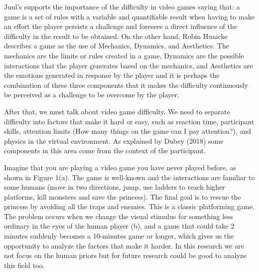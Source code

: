 Juul’s supports the importance of the difficulty in video games saying that: a game is a set of rules with a variable and quantifiable result when having to make an effort the player persists a challenge and foresees a direct influence of the difficulty in the result to be obtained. \cite{Aponte2009MeasuringDif}
On the other hand, Robin Hunicke describes a game as the use of Mechanics, Dynamics, and Aesthetics. The mechanics are the limits or rules created in a game, Dynamics are the possible interactions that the player generates based on the mechanics, and Aesthetics are the emotions generated in response by the player and it is perhaps the combination of these three components that it makes the difficulty continuously be perceived as a challenge to be overcome by the player. \cite{Aponte2009MeasuringDif}

After that, we must talk about video game difficulty. We need to separate difficulty into factors that make it hard or easy, such as reaction time, participant skills, attention limits (How many things on the game can I pay attention?), and physics in the virtual environment. As explained by Dubey (2018) some components in this area come from the context of the participant.  \cite{Dubey2018HumanPriors}

Imagine that you are playing a video game you have never played before, as shown in Figure 1(a). The game is well-known and the interactions are familiar to some humans (move in two directions, jump, use ladders to reach higher platforms, kill monsters and save the princess). The final goal is to rescue the princess by avoiding all the traps and enemies. This is a classic platforming game. 
The problem occurs when we change the visual stimulus for something less ordinary in the eyes of the human player (b), and a game that could take  2 minutes suddenly becomes a 10-minutes game or longer, which gives us the opportunity to analyze the factors that make it harder. In this research we are not focus on the human priors but for future research could be good to analyze this field too.
\cite{Dubey2018HumanPriors}



